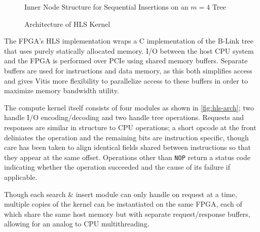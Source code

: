 \begin{figure}
	\centering
	
	\caption{Inner Node Structure for Sequential Insertions on an $m=4$ Tree}
	\label{fig:sequential-imbalance}
\end{figure}



\begin{figure}
	\centering
	
	\caption{Architecture of HLS Kernel}
	\label{fig:hls-arch}
\end{figure}

The FPGA's HLS implementation wraps a C implementation of the B-Link tree that
uses purely statically allocated memory. I/O between the host CPU system and the
FPGA is performed over PCIe using shared memory buffers. Separate buffers are
used for instructions and data memory, as this both simplifies access and gives
Vitis more flexibility to parallelize access to these buffers in order to
maximize memory bandwidth utility.

The compute kernel itself consists of four modules as shown in
\autoref{fig:hls-arch}; two handle I/O encoding/decoding and two handle tree
operations. Requests and responses are similar in structure to CPU operations; a
short opcode at the front deliniates the operation and the remaining bits are
instruction specific, though care has been taken to align identical fields
shared between instructions so that they appear at the same offset. Operations
other than \texttt{NOP} return a status code indicating whether the operation
succeeded and the cause of its failure if applicable.

Though each search \& insert module can only handle on request at a time,
multiple copies of the kernel can be instantiated on the same FPGA, each of
which share the same host memory but with separate request/response buffers,
allowing for an analog to CPU multithreading.
